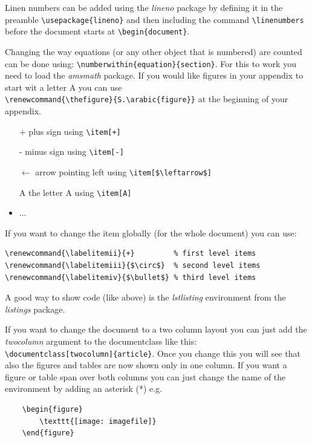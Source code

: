 \documentclass{article}
\numberwithin{equation}{section}
\begin{document}
Linen numbers can be added using the \textit{lineno} package by defining it in the preamble \texttt{\textbackslash usepackage\{lineno\}} and then including the command \texttt{\textbackslash linenumbers} before the document starts at \texttt{\textbackslash begin\{document\}}.

Changing the way equations (or any other object that is numbered) are counted can be done using: \texttt{\textbackslash numberwithin\{equation\}\{section\}}. For this to work you need to load the \textit{amsmath} package. If you would like figures in your appendix to start wit a letter A you can use \\ \texttt{\textbackslash renewcommand\{\textbackslash thefigure\}\{S.\textbackslash arabic\{figure\}\}} at the beginning of your appendix.

\begin{itemize}
	\item[+] plus sign using \texttt{\textbackslash item[+]}
	\item[-] minus sign using \texttt{\textbackslash item[-]}
	\item[$\leftarrow$] arrow pointing left using \texttt{\textbackslash item[\$\textbackslash leftarrow\$]}
	\item[A] the letter A using \texttt{\textbackslash item[A]}
	\item ...
\end{itemize}

If you want to change the item globally (for the whole document) you can use:
\begin{lstlisting}
\renewcommand{\labelitemii}{+}         % first level items
\renewcommand{\labelitemiii}{$\circ$}  % second level items
\renewcommand{\labelitemiv}{$\bullet$} % third level items
\end{lstlisting}

A good way to show code (like above) is the \textit{lstlisting} environment from the \textit{listings} package.

If you want to change the document to a two column layout you can just add the \textit{twocolumn} argument to the documentclass like this:\\ \texttt{\textbackslash documentclass[twocolumn]\{article\}}. Once you change this you will see that also the figures and tables are now shown only in one column. If you want a figure or table span over both columns you can just change the name of the environment by adding an asterisk (*) e.g.

\begin{lstlisting}
	\begin{figure}
		\texttt{[image: imagefile]}
	\end{figure}
\end{lstlisting}
\end{document}
